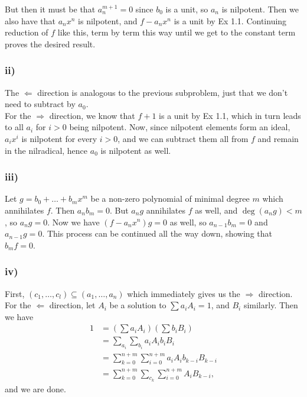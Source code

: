\documentclass{article}
\theoremstyle{definition}
\begin{document}
But then it must be that $a^{m + 1}_n = 0$ since $b_0$ is a unit, so $a_n$ is
nilpotent. Then we also have that $a_n x^n$ is nilpotent, and $f - a_n x^n$ is
a unit by Ex 1.1. Continuing reduction of $f$ like this, term by term this way
until we get to the constant term proves the desired result.

\subsubsection*{ii)}

The $\Leftarrow$ direction is analogous to the previous subproblem, just that
we don't need to subtract by $a_0$. \\

For the $\Rightarrow$ direction, we know that $f + 1$ is a unit by Ex 1.1,
which in turn leads to all $a_i$ for $i > 0$ being nilpotent. Now, since
nilpotent elements form an ideal, $a_i x^i$ is nilpotent for every $i > 0$, and
we can subtract them all from $f$ and remain in the nilradical, hence $a_0$ is
nilpotent as well.

\subsubsection*{iii)}
Let $g = b_0 + \ldots + b_m x^m$ be a non-zero polynomial of minimal degree $m$ which annihilates $f$. Then $a_n b_m = 0$. But $a_n g$ annihilates $f$ as well, and $\deg(a_n g) < m$, so $a_n g = 0$. Now we have $(f - a_nx^n)g = 0$ as well, so $a_{n-1}b_m = 0$ and $a_{n-1}g = 0$. This process can be continued all the way down, showing that $b_m f = 0$.

\subsubsection*{iv)}
First, $(c_1, \ldots, c_l) \subseteq (a_1, \ldots, a_n)$ which immediately gives us the $\Rightarrow$ direction. \\

For the $\Leftarrow$ direction, let $A_i$ be a solution to $\sum a_i A_i = 1$,
and $B_i$ similarly. Then we have
\begin{align*}
	1
	 & = \left(\sum a_i A_i \right)  \left(\sum b_i B_i \right)                \\
	 & = \sum_{a_i} \sum_{b_i} a_i A_i b_i B_i                                 \\
	 & = \sum_{k = 0}^{n + m} \sum_{i = 0}^{n + m} a_i A_i b_{k - i} B_{k - i} \\
	 & = \sum_{k = 0}^{n + m} \sum_{c_k} \sum_{i = 0}^{n + m} A_i B_{k - i},
\end{align*}
and we are done.
\end{document}
